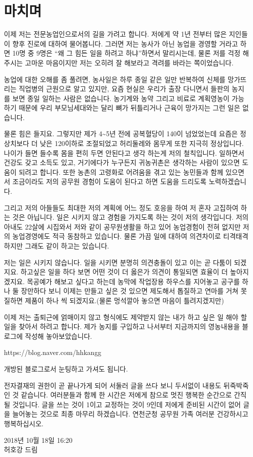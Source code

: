 \documentclass[chapter,book,openany,twoside]{oblivoir}
\begin{document}
\section{마치며}

이제 저는 전문농업인으로서의 길을 가려고 합니다. 저에게 약 1년 전부터 많은 지인들이 향후 진로에 대하여 물어봅니다. 그러면 저는 농사가 아닌 농업을 경영할 거라고 하면 10명 중 9명은 ``왜 그 힘든 일을 하려고 하냐''하면서 말리시는데, 물론 저를 걱정 해 주시는 고마운 마음이지만 저는 오히려 잘 해보라고 격려를 바라는 쪽이었습니다.

농업에 대한 오해를 좀 풀려면, 농사일은 하루 종일 같은 일만 반복하여 신체를 망가뜨리는 직업병의 근원으로 알고 있지만, 요즘 현실은 우리가 출장 다니면서 들판의 농지를 보면 종일 일하는 사람은 없습니다. 농기계와 농약 그리고 비료로 계획영농이 가능하기 때문에 우리 부모님세대와는 달리 뼈가 뒤틀리거나 근육이 망가지는 그런 일은 없습니다.

물론 힘은 들지요. 그렇지만 제가 4\textasciitilde5년 전에 공복혈당이 140이 넘었었는데 요즘은 정상치보다 더 낮은 120이하로 조절되었고 허리둘레와 몸무게 또한 지극히 정상입니다. 나이가 들면 들수록 몸을 편히 두면 안된다고 생각 하는게 저의 철칙입니다. 일하면서 건강도 갖고 소득도 있고, 거기에다가 누구든지 귀농귀촌은 생각하는 사람이 있으면 도움이 되려고 합니다. 또한 농촌의 고령화로 어려움을 겪고 있는 농민들과 함께 있으면서 조금이라도 저의 공무원 경험이 도움이 된다고 하면 도움을 드리도록 노력하겠습니다.

그리고 저의 아들들도 최대한 저의 계획에 어느 정도 호응을 하여 저 혼자 고집하여 하는 것은 아닙니다. 일은 시키지 않고 경험을 가지도록 하는 것이 저의 생각입니다. 저의 아내도 22살에 시집와서 저와 같이 공무원생활을 하고 있어 농업경험이 전혀 없지만 저의 농업경영에도 적극 동참하고 있습니다. 물론 가끔 일에 대하여 의견차이로 티격태격 하지만 그래도 같이 하고는 있습니다.

저는 일은 시키지 않습니다. 일을 시키면 분명히 의견충돌이 있고 이는 곧 다툼이 되겠지요. 하고싶은 일을 하다 보면 어떤 것이 더 옳은가 의견이 통일되면 효율이 더 높아지겠지요. 목공예가 해보고 싶다고 하는데 농막에 작업장용 하우스를 지어놓고 공구를 하나 둘 장만하다 보니 이제는 만들고 싶은 것 있으면 제도해서 톱질하고 연마를 거쳐 못질하면 제품이 하나 씩 되겠지요.(물론 멍석깔아 놓으면 마음이 틀려지겠지만)

이제 저는 출퇴근에 얽매이지 않고 형식에도 제약받지 않는 내가 하고 싶은 일 해야 할 일을 찾아서 하려고 합니다. 제가 농지를 구입하고 나서부터 지금까지의 영농내용을 블로그에 작성해 놓아보았습니다.
\begin{center}
https://blog.naver.com/hhkangg
\end{center}
개방된 블로그로서 눈팅하고 가셔도 됩니다. 

전자결재의 권한이 곧 끝나가게 되어 서둘러 글을 쓰다 보니 두서없이 내용도 뒤죽박죽인 것 같습니다. 여러분들과 함께 한 시간은 저에게 참으로 멋진 행복한 순간으로 간직될 것입니다. 글을 쓰는 것이 1이고 교정하는 것이 9인데 저에게 준비된 시간이 없어 글을 늘어놓는 것으로 최종 마무리 하겠습니다. 연천군청 공무원 가족 여러분 건강하시고 행복하십시오.

{\flushright
2018년 10월 18일 16:20}\\
{ 허호강 드림}
\end{document}
